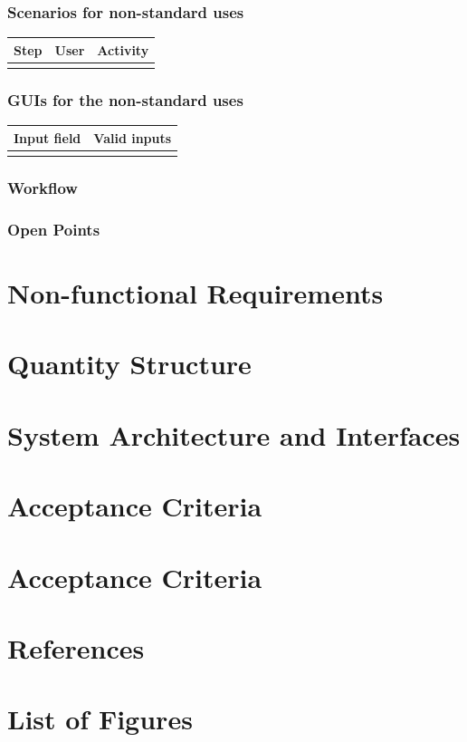 \documentclass[12pt]{article}
\theoremstyle{definition}
\begin{document}
\subsubsection{Scenarios for non-standard uses}

\begin{tabular}{|l|l|l|}
\hline
Step & User & Activity \\ \hline
 & & \\ \hline
\end{tabular}

\subsubsection{GUIs for the non-standard uses}

\begin{tabular}{|l|l|}
\hline
Input field & Valid inputs \\ \hline
 &  \\ \hline
\end{tabular}

\subsubsection{Workflow}

\subsubsection{Open Points}

\pagebreak

\section{Non-functional Requirements}

\pagebreak

\section{Quantity Structure}

\pagebreak

\section{System Architecture and Interfaces}

\pagebreak

\section{Acceptance Criteria}

\pagebreak

\section{Acceptance Criteria}

\pagebreak

\section{References}

\pagebreak

\section{List of Figures}

\pagebreak
\end{document}
